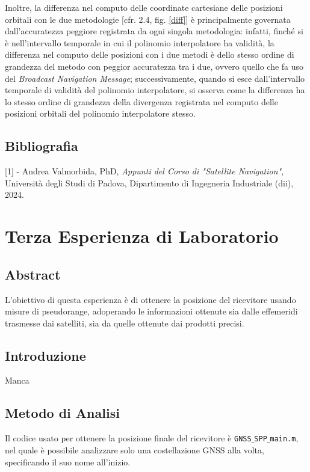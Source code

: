 \documentclass[a4paper,11pt,twoside]{book}
\begin{document}
	Inoltre, la differenza nel computo delle coordinate cartesiane delle posizioni orbitali con le due metodologie [cfr. 2.4, fig. \ref{diff}] è principalmente governata dall'accuratezza peggiore registrata da ogni singola metodologia: infatti, finché si è nell'intervallo temporale in cui il polinomio interpolatore ha validità, la differenza nel computo delle posizioni con i due metodi è dello stesso ordine di grandezza del metodo con peggior accuratezza tra i due, ovvero quello che fa uso del \textit{Broadcast Navigation Message}; successivamente, quando si esce dall'intervallo temporale di validità del polinomio interpolatore, si osserva come la differenza ha lo stesso ordine di grandezza della divergenza registrata nel computo delle posizioni orbitali del polinomio interpolatore stesso.
	
	\section{Bibliografia}
	
	[1] - Andrea Valmorbida, PhD, \textit{Appunti del Corso di "Satellite Navigation"}, Università degli Studi di Padova, Dipartimento di Ingegneria Industriale (dii), 2024.
	
	\chapter{Terza Esperienza di Laboratorio}
	
	\section{Abstract}
	
	L'obiettivo di questa esperienza è di ottenere la posizione del ricevitore usando misure di pseudorange, adoperando le informazioni ottenute sia dalle effemeridi trasmesse dai satelliti, sia da quelle ottenute dai prodotti precisi.
	
	\section{Introduzione}
	
	Manca
	
	\section{Metodo di Analisi}
	
	Il codice usato per ottenere la posizione finale del ricevitore è \texttt{GNSS$\_$SPP$\_$main.m}, nel quale è possibile analizzare solo una costellazione GNSS alla volta, specificando il suo nome all'inizio.
	
\end{document}
